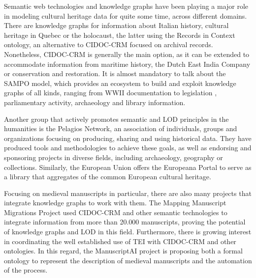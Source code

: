 \documentclass{article}
\begin{document}
Semantic web technologies and knowledge graphs have been playing a major role in modeling cultural heritage data for quite some time\cite{oneill_digital_2022}, across different domains.
There are knowledge graphs for information about Italian history\cite{carriero2019italy}, cultural heritage in Quebec\cite{marchand2020french}  or the holocaust\cite{herminio2023holocaust}, the latter using the Records in Context ontology, an alternative to CIDOC-CRM focused on archival records.
Nonetheless, CIDOC-CRM is generally the main option\cite{10.1145/3771098}, as it can be extended to accommodate information from maritime history\cite{fafalios2023sealit}, the Dutch East India Company\cite{van_wissen_2024_14065407} or conservation and restoration\cite{bannour2018crmcr}.
It is almost mandatory to talk about the SAMPO model\cite{hyvonen_digital_2023}, which provides an ecosystem to build and exploit knowledge graphs of all kinds, ranging from WWII documentation to legislation \cite{hyvonen-et-al-lawsampo-2021}, parliamentary activity\cite{hyvonen_finnish_2022}, archaeology\cite{rantala-et-al-findsampo-dhnb-2022} and library information\cite{ahola2025booksampo}.

Another group that actively promotes semantic and LOD principles in the humanities is the Pelagios Network, an association of individuals, groups and organizations focusing on producing, sharing and using historical data.
They have produced tools and methodologies to achieve these goals, as well as endorsing and sponsoring projects in diverse fields, including archaeology, geography or collections.
Similarly, the European Union offers the Europeana Portal to serve as a library that aggregates of the common European cultural heritage.

Focusing on medieval manuscripts in particular, there are also many projects that integrate knowledge graphs to work with them.
The Mapping Manuscript Migrations Project used CIDOC-CRM and other semantic technologies to integrate information from more than 20.000 manuscripts, proving the potential of knowledge graphs and LOD in this field\cite{koho2022mmm}.
Furthermore, there is growing interest in coordinating the well established use of TEI with CIDOC-CRM and other ontologies\cite{eide_ontologies_2014}.
In this regard, the ManuscriptAI project is proposing both a formal ontology to represent the description of medieval manuscripts and the automation of the process\cite{boodts_manuscript-ai_2025}.
\end{document}
